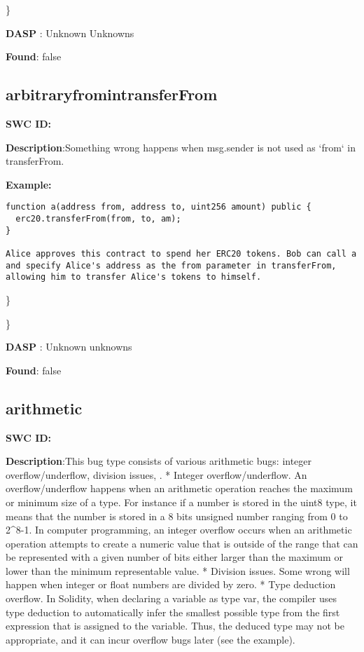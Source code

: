 \documentclass{article}
\begin{document}
\} 

\textbf{DASP} : Unknown Unknowns

\textbf{Found}: false

\subsection{arbitrary\textunderscore from\textunderscore in\textunderscore transferFrom} 
\textbf{SWC \textunderscore ID:} 

\textbf{Description}:Something wrong happens when msg.sender is not used as `from` in transferFrom.


\textbf{Example:} 
\begin{verbatim}
function a(address from, address to, uint256 amount) public {
  erc20.transferFrom(from, to, am);
}

Alice approves this contract to spend her ERC20 tokens. Bob can call a and specify Alice's address as the from parameter in transferFrom, allowing him to transfer Alice's tokens to himself.

\end{verbatim}\} 

\} 

\textbf{DASP} : Unknown unknowns

\textbf{Found}: false

\subsection{arithmetic} 
\textbf{SWC \textunderscore ID:} 

\textbf{Description}:This bug type consists of various arithmetic bugs: integer overflow/underflow, division issues, .
* Integer overflow/underflow. An overflow/underflow happens when an arithmetic operation reaches the maximum or minimum size of a type. For instance if a number is stored in the uint8 type, it means that the number is stored in a 8 bits unsigned number ranging from 0 to 2^8-1. In computer programming, an integer overflow occurs when an arithmetic operation attempts to create a numeric value that is outside of the range that can be represented with a given number of bits either larger than the maximum or lower than the minimum representable value.
* Division issues. Some wrong will happen when integer or float numbers are divided by zero.
* Type deduction overflow. In Solidity, when declaring a variable as type var, the compiler uses type deduction to automatically infer the smallest possible type from the first expression that is assigned to the variable. Thus, the deduced type may not be appropriate, and it can incur overflow bugs later (see the example).
\end{document}
